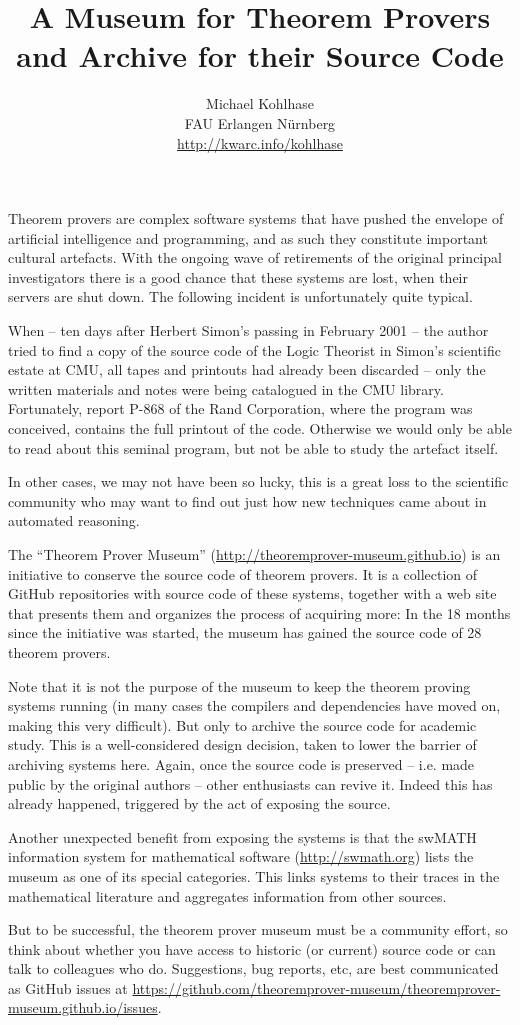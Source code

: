 \documentclass{article}
\title{A Museum for Theorem Provers\\ and Archive for their Source Code}
\author{Michael Kohlhase\\FAU Erlangen N\"urnberg\\\url{http://kwarc.info/kohlhase}}
\begin{document}
\maketitle

Theorem provers are complex software systems that have pushed the envelope of artificial
intelligence and programming, and as such they constitute important cultural artefacts.
With the ongoing wave of retirements of the original principal investigators there is a
good chance that these systems are lost, when their servers are shut down. The following
incident is unfortunately quite typical.

When -- ten days after Herbert Simon's passing in
February 2001 -- the author tried to find a copy of the source code of the Logic Theorist
in Simon's scientific estate at CMU, all tapes and printouts had already been discarded --
only the written materials and notes were being catalogued in the CMU
library. Fortunately, report P-868 of the Rand Corporation, where the program was
conceived, contains the full printout of the code. Otherwise we would only be able to read
about this seminal program, but not be able to study the artefact itself.

In other cases, we may not have been so lucky, this is a great loss to the scientific
community who may want to find out just how new techniques came about in automated
reasoning.  

The ``Theorem Prover Museum'' (\url{http://theoremprover-museum.github.io}) is an
initiative to conserve the source code of theorem provers. It is a collection of GitHub
repositories with source code of these systems, together with a web site that presents
them and organizes the process of acquiring more: In the 18 months since the initiative
was started, the museum has gained the source code of 28 theorem provers.
 
Note that it is not the purpose of the museum to keep the theorem proving systems running
(in many cases the compilers and dependencies have moved on, making this very
difficult). But only to archive the source code for academic study.  This is a
well-considered design decision, taken to lower the barrier of archiving systems
here. Again, once the source code is preserved -- i.e. made public by the original authors
-- other enthusiasts can revive it. Indeed this has already happened, triggered by the act
of exposing the source.

Another unexpected benefit from exposing the systems is that the \textsf{swMATH}
information system for mathematical software (\url{http://swmath.org}) lists the museum as
one of its special categories. This links systems to their traces in the mathematical
literature and aggregates information from other sources.

But to be successful, the theorem prover museum must be a community effort, so think about
whether you have access to historic (or current) source code or can talk to colleagues who
do. Suggestions, bug reports, etc, are best communicated as GitHub issues at
\url{https://github.com/theoremprover-museum/theoremprover-museum.github.io/issues}.
\end{document}
